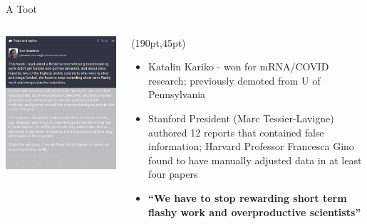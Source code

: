\documentclass{beamer}
\begin{document}
\begin{frame}{A Toot}

	\begin{columns}
		\includegraphics[width=1\textwidth]{../images/Toot_yyn}

		\begin{textblock*}{170pt}(190pt,45pt)
			\begin{itemize}
			\item<2-> Katalin Kariko - won for mRNA/COVID research; previously demoted from U of Pennsylvania
			\item<3-> Stanford President (Marc Tessier-Lavigne) authored 12 reports that contained false information; Harvard Professor Francesca Gino found to have manually adjusted data in at least four papers
			\item<4-> \textbf{``We have to stop rewarding short term flashy work and overproductive scientists''}
			\end{itemize}

		\end{textblock*}

	\end{columns}

\end{frame}
\end{document}
